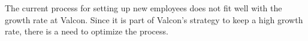 The current process for setting up new employees does not fit well with the growth rate at Valcon.
Since it is part of Valcon's strategy to keep a high growth rate, there is a need to optimize the process.
